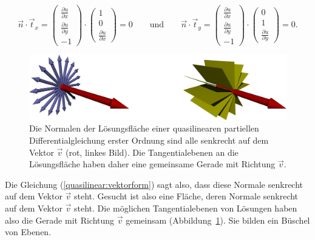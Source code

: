 \[
\vec n\cdot\vec t_x
=
\begin{pmatrix}
\frac{\partial u}{\partial x}\\
\frac{\partial u}{\partial y}\\
-1
\end{pmatrix}
\cdot
\begin{pmatrix}1\\0\\\frac{\partial u}{\partial x}\end{pmatrix}
=0
\qquad
\text{und}
\qquad
\vec n\cdot\vec t_y
=
\begin{pmatrix}
\frac{\partial u}{\partial x}\\
\frac{\partial u}{\partial y}\\
-1
\end{pmatrix}
\cdot
\begin{pmatrix}0\\1\\\frac{\partial u}{\partial y}\end{pmatrix}
=0.
\]
\begin{figure}
\begin{center}
\includegraphics[width=\hsize]{../common/3d/normals.jpg}
\end{center}
\caption{Die Normalen der Lösungsfläche einer quasilinearen
partiellen Differentialgleichung erster Ordnung sind alle senkrecht
auf dem Vektor $\vec v$ (rot, linkes Bild). Die Tangentialebenen an
die Lösungsfläche haben daher eine gemeinsame Gerade mit Richtung $\vec v$.
\label{geometrie:normals}}
\end{figure}%
Die Gleichung (\ref{quasilinear:vektorform}) sagt also,
dass diese Normale senkrecht auf dem Vektor $\vec v$ steht.
Gesucht ist also eine Fläche, deren Normale senkrecht auf dem
Vektor $\vec v$ steht. Die möglichen Tangentialebenen von Lösungen
haben also die Gerade mit Richtung $\vec v$ gemeinsam
(Abbildung~\ref{geometrie:normals}).
Sie bilden ein Büschel von Ebenen.

